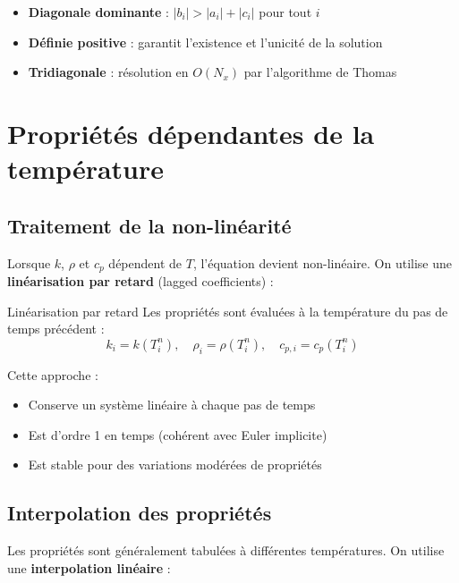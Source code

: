 \documentclass[11pt,a4paper]{article}
\begin{document}
\begin{itemize}
    \item \textbf{Diagonale dominante} : $|b_i| > |a_i| + |c_i|$ pour tout $i$
    \item \textbf{Définie positive} : garantit l'existence et l'unicité de la solution
    \item \textbf{Tridiagonale} : résolution en $O(N_x)$ par l'algorithme de Thomas
\end{itemize}

\section{Propriétés dépendantes de la température}

\subsection{Traitement de la non-linéarité}

Lorsque $k$, $\rho$ et $c_p$ dépendent de $T$, l'équation devient non-linéaire. On utilise une \textbf{linéarisation par retard} (lagged coefficients) :

\begin{hypothese}{Linéarisation par retard}{}
Les propriétés sont évaluées à la température du pas de temps précédent :
\begin{equation}
k_i = k(T_i^n), \quad \rho_i = \rho(T_i^n), \quad c_{p,i} = c_p(T_i^n)
\end{equation}
\end{hypothese}

Cette approche :
\begin{itemize}
    \item Conserve un système linéaire à chaque pas de temps
    \item Est d'ordre 1 en temps (cohérent avec Euler implicite)
    \item Est stable pour des variations modérées de propriétés
\end{itemize}

\subsection{Interpolation des propriétés}

Les propriétés sont généralement tabulées à différentes températures. On utilise une \textbf{interpolation linéaire} :
\end{document}
